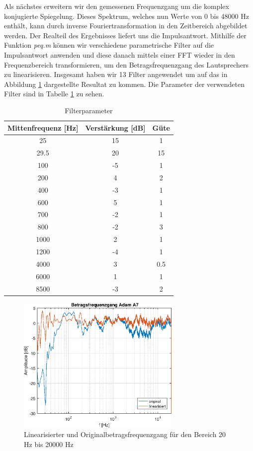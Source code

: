 Als nächstes erweitern wir den gemessenen Frequenzgang um die komplex konjugierte Spiegelung. 
Dieses Spektrum, welches nun Werte von 0 bis 48000 Hz enthält, kann durch inverse Fouriertransformation in den Zeitbereich abgebildet werden.
Der Realteil des Ergebnisses liefert uns die Impulsantwort.
Mithilfe der Funktion \textit{peq.m} können wir verschiedene parametrische Filter auf die Impulsantwort anwenden und diese danach mittels einer FFT wieder in den Frequenzbereich transformieren, um den Betragsfrequenzgang des Lautsprechers zu linearisieren.
Insgesamt haben wir 13 Filter angewendet um auf das in Abbildung \ref{fig:frequenzgangA7_lin} dargestellte Resultat zu kommen.
Die Parameter der verwendeten Filter sind in Tabelle \ref{tab:filterparameter} zu sehen.

\begin{table}[H]
    \centering
    \caption{Filterparameter}
    \label{tab:filterparameter}
    \begin{tabular}{| c |c |c |}
    	\hline
        Mittenfrequenz [Hz] & Verstärkung [dB] & Güte\\
        \hline
        25 & 15 & 1 \\
		29.5 & 20 & 15 \\
		100 & -5 & 1\\
		200 & 4 & 2\\
		400 & -3 & 1 \\
		600 & 5 & 1\\
		700 &-2 & 1 \\
		800 & -2 & 3\\
		1000 & 2 & 1\\
		1200 & -4 & 1\\
		4000 & 3 & 0.5\\
		6000 & 1 & 1\\
		8500 & -3 & 2\\
        \hline
    \end{tabular}
\end{table}

\begin{figure}[H]
        \centering
        \includegraphics[width=0.7\textwidth]{Figures/frequenzgangA7_lin.eps}
        \caption{Linearisierter und Originalbetragsfrequenzgang für den Bereich 20 Hz bis 20000 Hz}
        \label{fig:frequenzgangA7_lin}
\end{figure}




